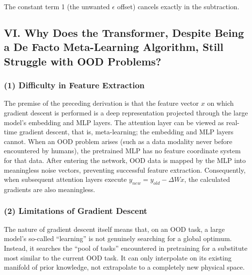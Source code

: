 The constant term 1 (the unwanted \(\epsilon\) offset) cancels exactly in the subtraction.

\hypertarget{vi.-why-does-the-transformer-despite-being-a-de-facto-meta-learning-algorithm-still-struggle-with-ood-problems}{%
\subsection{VI. Why Does the Transformer, Despite Being a De Facto Meta-Learning Algorithm, Still Struggle with OOD Problems?}\label{vi.-why-does-the-transformer-despite-being-a-de-facto-meta-learning-algorithm-still-struggle-with-ood-problems}}

\hypertarget{difficulty-in-feature-extraction}{%
\subsubsection{(1) Difficulty in Feature Extraction}\label{difficulty-in-feature-extraction}}

The premise of the preceding derivation is that the feature vector \(x\) on which gradient descent is performed is a deep representation projected through the large model's embedding and MLP layers. The attention layer can be viewed as real-time gradient descent, that is, meta-learning; the embedding and MLP layers cannot. When an OOD problem arises (such as a data modality never before encountered by humans), the pretrained MLP has no feature coordinate system for that data. After entering the network, OOD data is mapped by the MLP into meaningless noise vectors, preventing successful feature extraction. Consequently, when subsequent attention layers execute \(y_{new}=y_{old}-\Delta Wx\), the calculated gradients are also meaningless.

\hypertarget{limitations-of-gradient-descent}{%
\subsubsection{(2) Limitations of Gradient Descent}\label{limitations-of-gradient-descent}}

The nature of gradient descent itself means that, on an OOD task, a large model's so-called ``learning'' is not genuinely searching for a global optimum. Instead, it searches the ``pool of tasks'' encountered in pretraining for a substitute most similar to the current OOD task. It can only interpolate on its existing manifold of prior knowledge, not extrapolate to a completely new physical space.

